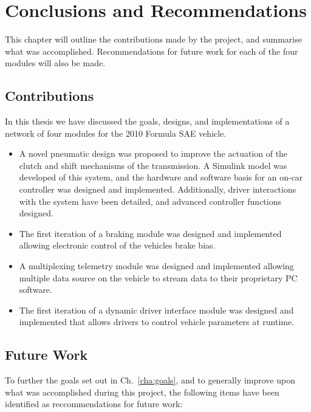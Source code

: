 
\chapter{Conclusions and Recommendations}

This chapter will outline the contributions made by the project, and summarise what was accomplished. Recommendations for future work for each of the four modules will also be made.

\section{Contributions}

In this thesis we have discussed the goals, designs, and implementations of a network of four modules for the 2010 Formula SAE vehicle.

\begin{itemize}
  \item A novel pneumatic design was proposed to improve the actuation of the clutch and shift mechanisms of the transmission. A Simulink model was developed of this system, and the hardware and software basis for an on-car controller was designed and implemented. Additionally, driver interactions with the system have been detailed, and advanced controller functions designed.

  \item The first iteration of a braking module was designed and implemented allowing electronic control of the vehicles brake bias.

  \item A multiplexing telemetry module was designed and implemented allowing multiple data source on the vehicle to stream data to their proprietary PC software.

  \item The first iteration of a dynamic driver interface module was designed and implemented that allows drivers to control vehicle parameters at runtime.
\end{itemize}

\section{Future Work}

To further the goals set out in Ch.\ \ref{cha:goals}, and to generally improve upon what was accomplished during this project, the following items have been identified as reccommendations for future work:

